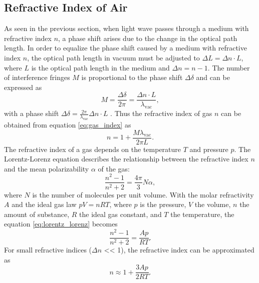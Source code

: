 \subsection{Refractive Index of Air}
As seen in the previous section, when light wave passes through a medium with refractive index $n$, a phase shift arises due to the change in the optical path length.
In order to equalize the phase shift caused by a medium with refractive index $n$, the optical path length in vacuum must be adjusted to $\Delta L = \Delta n \cdot L$, where $L$ is the optical path length in the medium and $\Delta n = n - 1$.
The number of interference fringes $M$ is proportional to the phase shift $\Delta \delta$ and can be expressed as
\begin{equation}
    M = \frac{\Delta \delta}{2\pi} = \frac{\Delta n \cdot L}{\lambda_\text{vac}},
    \label{eq:gas_index}
\end{equation}
with a phase shift $\Delta \delta = \frac{2\pi}{\lambda_\text{vac}} \Delta n \cdot L$ \cite{sample}.
Thus the refractive index of gas $n$ can be obtained from equation \eqref{eq:gas_index} as
\begin{equation}
    n = 1 + \frac{M \lambda_\text{vac}}{2 \pi L}.
\end{equation}
The refractive index of a gas depends on the temperature $T$ and pressure $p$.
The Lorentz-Lorenz equation describes the relationship between the refractive index $n$ and the mean polarizability $\alpha$ of the gas:
\begin{equation}
    \frac{n^2 - 1}{n^2 + 2} = \frac{4\pi}{3} N \alpha,
    \label{eq:lorentz_lorenz}
\end{equation}
where $N$ is the number of molecules per unit volume.
With the molar refractivity $A$ and the ideal gas law $pV = nRT$, where $p$ is the pressure, $V$ the volume, $n$ the amount of substance, $R$ the ideal gas constant, and $T$ the temperature, the equation \eqref{eq:lorentz_lorenz} becomes
\begin{equation}
    \frac{n^2 - 1}{n^2 + 2} = \frac{A p}{R T}.
\end{equation}
For small refractive indices ($\Delta n$ << 1), the refractive index can be approximated as
\begin{equation}
    n \approx 1 + \frac{3 A p}{2R T}.
    \label{eq:refractive_index_gas}
\end{equation}



